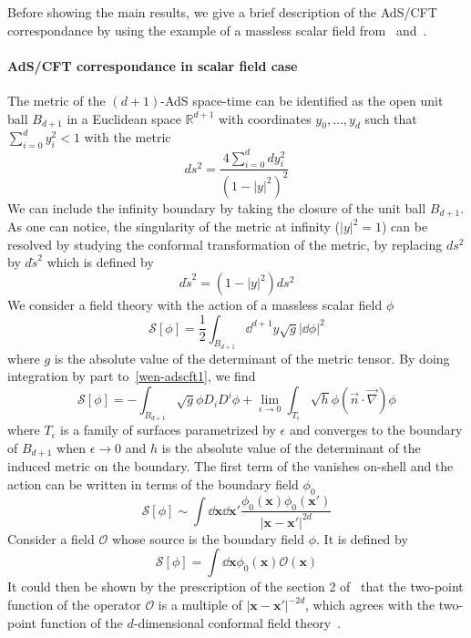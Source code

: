 Before showing the main results, 
we give a brief description of the AdS/CFT correspondance by using the example of a massless scalar field from~\cite{Witten1998} and~\cite{Skenderis2002}. 
%
\paragraph{AdS/CFT correspondance in scalar field case}
The metric of the $(d+1)$-AdS space-time can be identified as the open unit ball $B_{d+1}$ in a Euclidean space $\mathbb{R}^{d+1}$ with coordinates $y_0, \ldots, y_d$ such that $\sum_{i=0}^d y_i^2 <1$ with the metric
\begin{equation*}
ds^2 = \frac{4\sum_{i=0}^d dy_i^2}{(1 - |y|^2)^2}
\end{equation*}
We can include the infinity boundary by taking the closure of the unit ball $B_{d+1}$. 
As one can notice, the singularity of the metric at infinity ($|y|^2 = 1$) can be resolved by studying the conformal transformation of the metric, 
\ie by replacing $ds^2$ by $d\tilde{s}^2$ which is defined by
\begin{equation*}
d\tilde{s}^2 = (1 - |y|^2) ds^2
\end{equation*}
We consider a field theory with the action of a massless scalar field $\phi$
\begin{equation}\label{wen-adscft1}
\mathcal{S}[\phi] = \frac 1 2 \int_{B_{d+1}} \dd^{d+1} y \sqrt{g} |\dd \phi|^2
\end{equation}
where $g$ is the absolute value of the determinant of the metric tensor.
By doing integration by part to~\cref{wen-adscft1}, we find
\begin{equation*}
\mathcal{S}[\phi] = -\int_{B_{d+1}} \sqrt{g} \phi D_i D^i \phi + 
\lim_{\epsilon\rightarrow 0}\int_{T_\epsilon}  \sqrt{h} \phi (\vec{n}\cdot\vec{\nabla})\phi
\end{equation*}
where $T_\epsilon$ is a family of surfaces parametrized by $\epsilon$ and converges to the boundary of $B_{d+1}$ when $\epsilon\rightarrow 0$ and $h$ is the absolute value of the determinant of the induced metric on the boundary.
The first term of the \rhs vanishes on-shell and the action can be written in terms of the boundary field $\phi_0$
\begin{equation*}
\mathcal{S}[\phi] \sim \int \dd \mathbf{x} \dd \mathbf{x}' 
\frac{\phi_0(\mathbf{x})\phi_0(\mathbf{x}')}{|\mathbf{x} - \mathbf{x}'|^{2d}}
\end{equation*}
Consider a field $\mathcal{O}$ whose source is the boundary field $\phi$. 
It is defined by~\cite{Gubser1998}
\begin{equation*}
\mathcal{S}[\phi] = \int \dd \mathbf{x} \phi_0(\mathbf{x})\mathcal{O}(\mathbf{x})
\end{equation*}
It could then be shown by the prescription of the section 2 of~\cite{Skenderis2002} that the two-point function of the operator $\mathcal{O}$ is a multiple of $|\mathbf{x} - \mathbf{x}'|^{-2d}$, which agrees with the two-point function of the $d$-dimensional conformal field theory~\cite{Qualls2015}. \\\\
%
